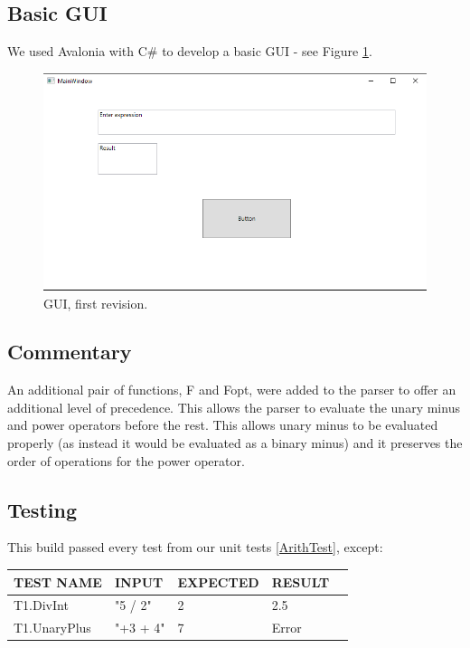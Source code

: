 \documentclass[a4paper, oneside, 11pt]{report}
\begin{document}
    \subsection{Basic GUI}
    We used Avalonia with C\# to develop a basic GUI - see Figure \ref{gui01}.

    \begin{figure}[htb]
        \begin{center}
            \includegraphics[width=0.9 \columnwidth]{GUI_01}
            \caption{GUI, first revision.}
            \label{gui01}
        \end{center}
    \end{figure}

    \subsection{Commentary}
    An additional pair of functions, F and Fopt, were added to the parser to offer an additional level of precedence. This allows the parser to evaluate the unary minus and power operators before the rest. This allows unary minus to be evaluated properly (as instead it would be evaluated as a binary minus) and it preserves the order of operations for the power operator.

    \subsection{Testing}
    This build passed every test from our unit tests \ref{ArithTest}, except:

    \begin{center}
        \begin{tabular}{|p{1.5in}|p{1.5in}|p{1.6in}|p{1.6in}|p{2.4in}|}
            \hline
            TEST NAME & INPUT & EXPECTED & RESULT \\
            \hline
            T1.DivInt & "5 / 2" & 2 & 2.5 \\
            \hline
            T1.UnaryPlus & "+3 + 4" & 7 & Error \\
            \hline
        \end{tabular}
    \end{center}
\end{document}
